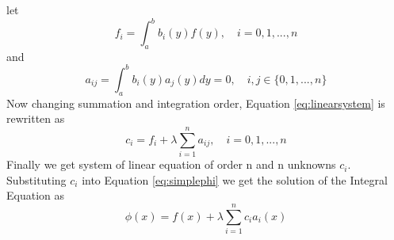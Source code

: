 \begin{appendix}
let 
\begin{equation}
f_i=\int_a^b b_i(y)f(y),\quad i=0, 1, ..., n 
\end{equation}
and 
\begin{equation}
a_{ij}=\int_a^b b_i(y)a_j(y) dy=0,\quad i,j \in \{0, 1, ..., n\} 
\end{equation}
Now changing summation and integration order, Equation \ref{eq:linearsystem} is rewritten as
\begin{equation}\label{eq:linearsystem}
c_i=f_i+\lambda \sum\limits_{i=1}^na_{ij},\quad i=0, 1, ..., n 
\end{equation}
Finally we get system of linear equation of order n and n unknowns $c_i$. Substituting $c_i$ into Equation \ref{eq:simplephi} we get the solution of the Integral Equation as 
 \begin{equation}\label{eq:simplephi}
 \phi(x)=f(x)+\lambda \sum\limits_{i=1}^nc_ia_i(x) 
\end{equation}

\end{appendix}